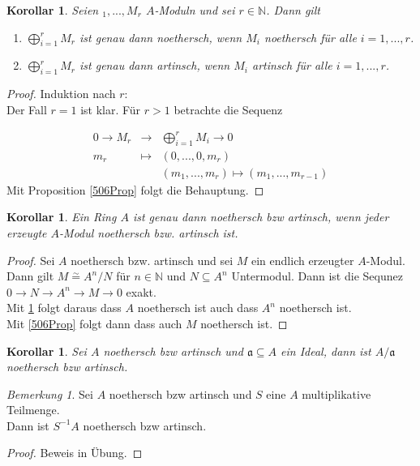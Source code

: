 \documentclass[10pt,a4paper]{article}
\newcommand{\N}{\ensuremath{\mathbb{N}}}
\newcommand{\isomorph}{\ensuremath{\overset{\sim}{=}}}
\newcounter{thm}[section]
\theoremstyle{definition}
\theoremstyle{plain}
\newtheorem{kor}[thm]{Korollar}
\theoremstyle{remark}
\newtheorem{bem}[thm]{Bemerkung}
\begin{document}
\begin{kor}
	\label{507Kor}
	Seien $_1,...,M_r$ $A$-Moduln und sei $r\in\N$. Dann gilt
	\begin{enumerate}
		\item $\bigoplus_{i=1}^rM_r$ ist genau dann noethersch, wenn $M_i$ noethersch für alle $i=1,...,r$.
		\item $\bigoplus_{i=1}^rM_r$ ist genau dann artinsch, wenn $M_i$ artinsch für alle $i=1,...,r$.
	\end{enumerate}
\end{kor}
\begin{proof}
	Induktion nach $r$:\\
	Der Fall $r=1$ ist klar. Für $r>1$ betrachte die Sequenz
	
	\[\begin{array}{rcl}
		0\rightarrow M_r &\rightarrow& \bigoplus_{i=1}^{r}M_i\rightarrow 0\\
		             m_r &\mapsto    & (0,...,0,m_r)                      \\
		                 &           & (m_1,...,m_r)         \mapsto      (m_1,...,m_{r-1})
	\end{array}\]
	Mit Proposition \ref{506Prop} folgt die Behauptung.
\end{proof}
\begin{kor}
	Ein Ring $A$ ist genau dann noethersch bzw artinsch, wenn jeder erzeugte $A$-Modul noethersch bzw. artinsch ist.
\end{kor}
\begin{proof}
	Sei $A$ noethersch bzw. artinsch und sei $M$ ein endlich erzeugter $A$-Modul. Dann gilt $M\isomorph A^n/N$ für $n\in\N$ und $N\subseteq A^n$ Untermodul. Dann ist die Sequnez $0\rightarrow N\rightarrow A^n\rightarrow M\rightarrow 0$ exakt.\\
	Mit \ref{507Kor} folgt daraus dass $A$ noethersch ist auch dass $A^n$ noethersch ist.\\
	Mit \ref{506Prop} folgt dann dass auch $M$ noethersch ist.
\end{proof}
\begin{kor}
	\label{509Kor}
	Sei $A$ noethersch bzw artinsch und $\mathfrak a\subseteq A$ ein Ideal, dann ist $A/\mathfrak a$ noethersch bzw artinsch.
\end{kor}
\begin{bem}
	Sei $A$ noethersch bzw artinsch und $S$  eine $A$ multiplikative Teilmenge.\\
	Dann ist $S^{-1}A$ noethersch bzw artinsch.
\end{bem}
\begin{proof}
	Beweis in Übung.
\end{proof}
\end{document}
